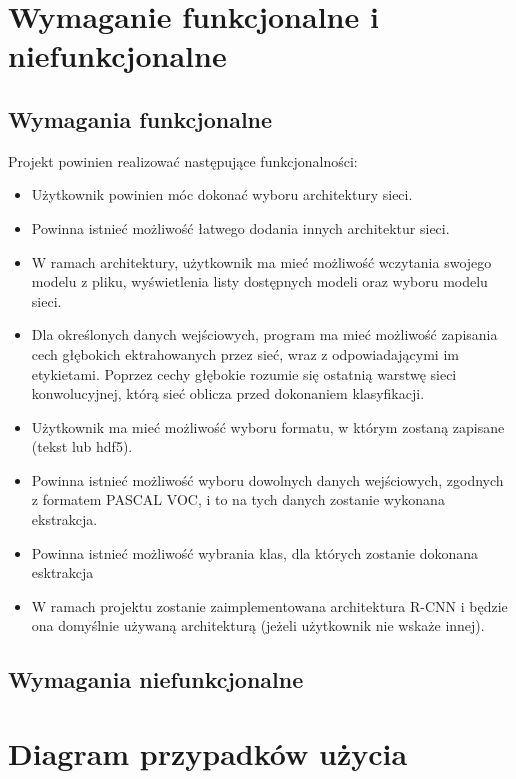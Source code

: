 \documentclass[a4paper,twoside,12pt]{book}
\begin{document}
{\section{Wymaganie funkcjonalne i niefunkcjonalne}
\subsection{Wymagania funkcjonalne}
{Projekt powinien realizować następujące funkcjonalności:
\begin{itemize}
\item{Użytkownik powinien móc dokonać wyboru architektury sieci.}
 \item {Powinna istnieć możliwość łatwego dodania innych architektur sieci.}
 \item{W ramach architektury, użytkownik ma mieć możliwość wczytania swojego modelu z pliku, wyświetlenia listy dostępnych modeli oraz wyboru modelu sieci.}
  \item {Dla określonych danych wejściowych, program ma mieć możliwość zapisania cech głębokich ektrahowanych przez sieć, wraz z odpowiadającymi im etykietami. Poprzez cechy głębokie rozumie się ostatnią warstwę sieci konwolucyjnej, którą sieć oblicza przed dokonaniem klasyfikacji. }
  \item{Użytkownik ma mieć możliwość wyboru formatu, w którym zostaną zapisane (tekst lub hdf5).}
  \item{Powinna istnieć możliwość wyboru dowolnych danych wejściowych, zgodnych z formatem PASCAL VOC, i to na tych danych zostanie wykonana ekstrakcja.}
  \item{Powinna istnieć możliwość wybrania klas, dla których zostanie dokonana esktrakcja}
  \item{W ramach projektu zostanie zaimplementowana architektura R-CNN i będzie ona domyślnie używaną architekturą (jeżeli użytkownik nie wskaże innej).}
\end{itemize}}
\subsection{Wymagania niefunkcjonalne}
{}
\section{Diagram przypadków użycia}
{
\begin{figure}[h!]


\end{figure}}}
\end{document}
